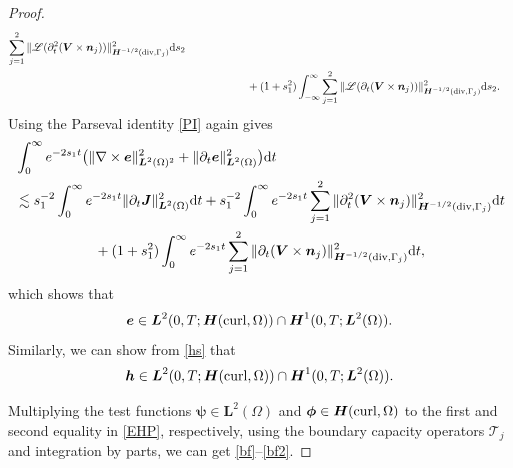 \documentclass[11pt,reqno]{amsart}
\numberwithin{equation}{section}
\begin{document}
\begin{proof}
\begin{align*}
\sum\limits_{j=1}^2\|\mathscr L (\partial_t^2 (\boldsymbol V \times \boldsymbol
n_j))\|^2_{\boldsymbol H^{-1/2} ({\rm div}, \Gamma_j)}  {\rm d} s_2 \\
&\hspace{2cm}+(1+s_1^2)\int_{-\infty}^{\infty}\sum\limits_{j=1}^2 \| \mathscr L
(\partial_t (\boldsymbol V \times \boldsymbol n_j))\|^2_{\boldsymbol H^{-1/2}
({\rm div}, \Gamma_j)}  {\rm d} s_2.
\end{align*}
Using the Parseval identity \eqref{PI} again gives
\begin{align*}
&\int_0^{\infty}
e^{-2 s_1 t}  \big ( \|\nabla \times \boldsymbol e \|_{\boldsymbol
L^2(\Omega)^2}^2
+\|\partial_t \boldsymbol e\|^2_{\boldsymbol L^2(\Omega)}\big) {\rm d} t\\
&\lesssim s_1^{-2} \int_0^{\infty} e^{-2 s_1 t}\|\partial_t \boldsymbol
J\|^2_{\boldsymbol L^2 (\Omega)} {\rm d} t
+s_1^{-2} \int_0^{\infty} e^{-2 s_1 t} \sum\limits_{j=1}^2
\|\partial_t^2 (\boldsymbol V \times \boldsymbol n_j)\|^2_{\boldsymbol H^{-1/2}
({\rm div}, \Gamma_j)}  {\rm d} t\\
&\hspace{2cm}+(1+s_1^2)\int_0^{\infty}e^{-2 s_1 t} \sum\limits_{j=1}^2
\| \partial_t (\boldsymbol V \times \boldsymbol n_j)\|^2_{\boldsymbol H^{-1/2}
({\rm div}, \Gamma_j)}  {\rm d} t,
\end{align*}
which shows that
\[
\boldsymbol e \in \boldsymbol L^2 (0, T; \boldsymbol H ({\rm curl}, \Omega )
) \cap \boldsymbol H^{1} (0, T; \boldsymbol L^2 (\Omega)).
\]
Similarly, we can show from \eqref{hs} that
\[
\boldsymbol h \in \boldsymbol L^2 (0, T; \boldsymbol H ({\rm curl}, \Omega )
)\cap \boldsymbol H^{1} (0, T; \boldsymbol L^2 (\Omega)).
\]

Multiplying the test functions $\boldsymbol \psi \in \boldsymbol L^2 (\Omega) $
and $\boldsymbol \phi \in \boldsymbol H ({\rm curl}, \Omega)$  to the first and
second equality in \eqref{EHP}, respectively, using the boundary capacity
operators $\mathscr T_j$ and integration by parts,  we can get 
\eqref{bf}--\eqref{bf2}.


\end{proof}
\end{document}

